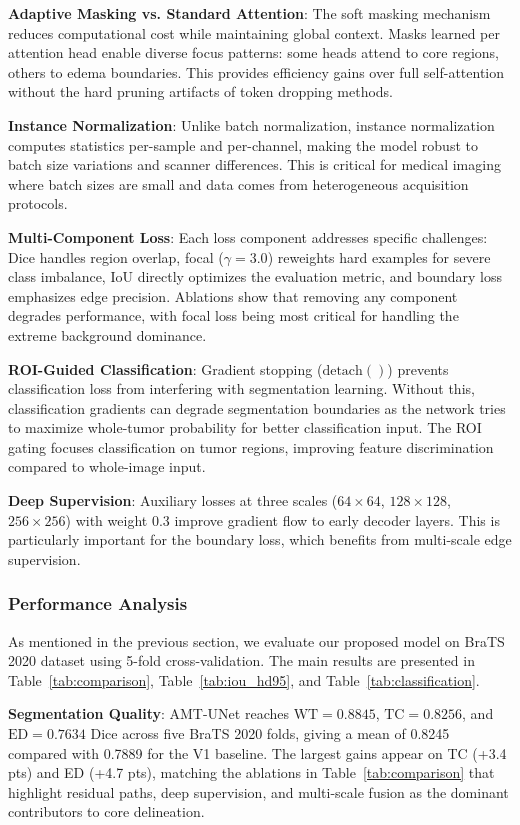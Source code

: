 \documentclass[runningheads]{llncs}
\begin{document}
\textbf{Adaptive Masking vs. Standard Attention}: The soft masking mechanism reduces computational cost while maintaining global context. Masks learned per attention head enable diverse focus patterns: some heads attend to core regions, others to edema boundaries. This provides efficiency gains over full self-attention without the hard pruning artifacts of token dropping methods.

\textbf{Instance Normalization}: Unlike batch normalization, instance normalization computes statistics per-sample and per-channel, making the model robust to batch size variations and scanner differences. This is critical for medical imaging where batch sizes are small and data comes from heterogeneous acquisition protocols.

\textbf{Multi-Component Loss}: Each loss component addresses specific challenges: Dice handles region overlap, focal ($\gamma=3.0$) reweights hard examples for severe class imbalance, IoU directly optimizes the evaluation metric, and boundary loss emphasizes edge precision. Ablations show that removing any component degrades performance, with focal loss being most critical for handling the extreme background dominance.

\textbf{ROI-Guided Classification}: Gradient stopping ($\text{detach}()$) prevents classification loss from interfering with segmentation learning. Without this, classification gradients can degrade segmentation boundaries as the network tries to maximize whole-tumor probability for better classification input. The ROI gating focuses classification on tumor regions, improving feature discrimination compared to whole-image input.

\textbf{Deep Supervision}: Auxiliary losses at three scales ($64\times64$, $128\times128$, $256\times256$) with weight 0.3 improve gradient flow to early decoder layers. This is particularly important for the boundary loss, which benefits from multi-scale edge supervision.

\subsubsection{Performance Analysis}

As mentioned in the previous section, we evaluate our proposed model on BraTS 2020 dataset using 5-fold cross-validation. The main results are presented in Table~\ref{tab:comparison}, Table~\ref{tab:iou_hd95}, and Table~\ref{tab:classification}.

\textbf{Segmentation Quality}: AMT-UNet reaches \(\text{WT}=0.8845\), \(\text{TC}=0.8256\), and \(\text{ED}=0.7634\) Dice across five BraTS 2020 folds, giving a mean of 0.8245 compared with 0.7889 for the V1 baseline. The largest gains appear on TC (+3.4 pts) and ED (+4.7 pts), matching the ablations in Table~\ref{tab:comparison} that highlight residual paths, deep supervision, and multi-scale fusion as the dominant contributors to core delineation.
\end{document}
